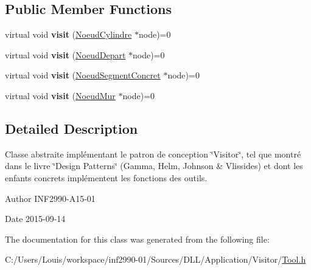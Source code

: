 \subsection*{Public Member Functions}
\begin{DoxyCompactItemize}
\item 
\hypertarget{class_tool_aae0deb2f98f4950c62a72d43f2b5e329}{}virtual void {\bfseries visit} (\hyperlink{class_noeud_cylindre}{Noeud\+Cylindre} $\ast$node)=0\label{class_tool_aae0deb2f98f4950c62a72d43f2b5e329}

\item 
\hypertarget{class_tool_ac2ff46411a7d46e2ee460dd392be2129}{}virtual void {\bfseries visit} (\hyperlink{class_noeud_depart}{Noeud\+Depart} $\ast$node)=0\label{class_tool_ac2ff46411a7d46e2ee460dd392be2129}

\item 
\hypertarget{class_tool_a80ac4596158237b53ec9f54af39f447c}{}virtual void {\bfseries visit} (\hyperlink{class_noeud_segment_concret}{Noeud\+Segment\+Concret} $\ast$node)=0\label{class_tool_a80ac4596158237b53ec9f54af39f447c}

\item 
\hypertarget{class_tool_afadb5dbece885b62cb43db48e8d89408}{}virtual void {\bfseries visit} (\hyperlink{class_noeud_mur}{Noeud\+Mur} $\ast$node)=0\label{class_tool_afadb5dbece885b62cb43db48e8d89408}

\end{DoxyCompactItemize}


\subsection{Detailed Description}
Classe abstraite implémentant le patron de conception \char`\"{}\+Visitor\char`\"{}, tel que montré dans le livre \char`\"{}\+Design Patterns\char`\"{} (Gamma, Helm, Johnson \& Vlissides) et dont les enfants concrets implémentent les fonctions des outils. 

\begin{DoxyAuthor}{Author}
I\+N\+F2990-\/\+A15-\/01 
\end{DoxyAuthor}
\begin{DoxyDate}{Date}
2015-\/09-\/14 
\end{DoxyDate}


The documentation for this class was generated from the following file\+:\begin{DoxyCompactItemize}
\item 
C\+:/\+Users/\+Louis/workspace/inf2990-\/01/\+Sources/\+D\+L\+L/\+Application/\+Visitor/\hyperlink{_tool_8h}{Tool.\+h}\end{DoxyCompactItemize}
